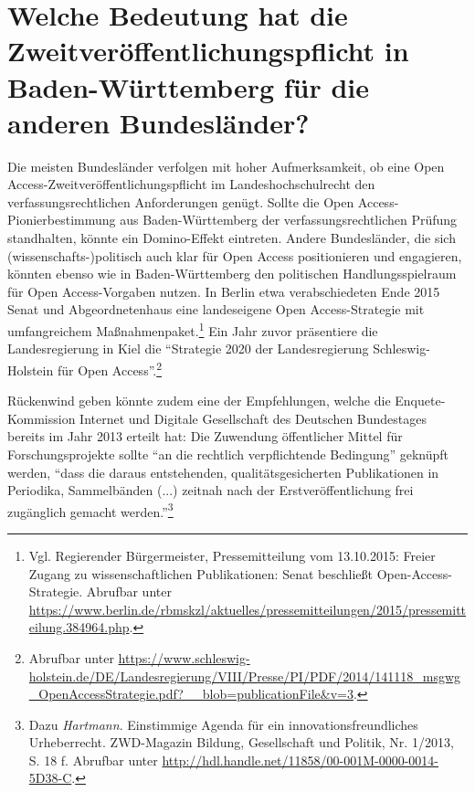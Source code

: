 \documentclass[a4paper,
fontsize=11pt,
oneside,
numbers=noperiodatend,
parskip=half-,
bibliography=totoc,
final
]{scrartcl}
\begin{document}
\hypertarget{welche-bedeutung-hat-die-zweitveruxf6ffentlichungspflicht-in-baden-wuxfcrttemberg-fuxfcr-die-anderen-bundesluxe4nder}{%
\section*{Welche Bedeutung hat die Zweit\-ver\-öffent\-lich\-ungs\-pflicht in
Baden-Württemberg für die anderen
Bundesländer?}\label{welche-bedeutung-hat-die-zweitveruxf6ffentlichungspflicht-in-baden-wuxfcrttemberg-fuxfcr-die-anderen-bundesluxe4nder}}

Die meisten Bundesländer verfolgen mit hoher Aufmerksamkeit, ob eine
Open Access-Zweit\-ver\-öffent\-lich\-ungs\-pflicht im Landeshochschulrecht den
verfassungsrechtlichen Anforderungen genügt. Sollte die Open
Access-Pionierbestimmung aus Baden-Württemberg der
verfassungsrechtlichen Prüfung standhalten, könnte ein Domino-Effekt
eintreten. Andere Bundesländer, die sich (wissenschafts-)politisch auch
klar für Open Access positionieren und engagieren, könnten ebenso wie in
Baden-Württemberg den politischen Handlungsspielraum für Open
Access-Vorgaben nutzen. In Berlin etwa verabschiedeten Ende 2015 Senat
und Abgeordnetenhaus eine landeseigene Open Access-Strategie mit
umfangreichem Maßnahmenpaket.\footnote{Vgl. Regierender Bürgermeister,
  Pressemitteilung vom 13.10.2015: Freier Zugang zu wissenschaftlichen
  Publikationen: Senat beschließt Open-Access-Strategie. Abrufbar unter
  \url{https://www.berlin.de/rbmskzl/aktuelles/pressemitteilungen/2015/pressemitteilung.384964.php}.}
Ein Jahr zuvor präsentiere die Landesregierung in Kiel die
\enquote{Strategie 2020 der Landesregierung Schleswig-Holstein für Open
Access}.\footnote{Abrufbar unter
  \url{https://www.schleswig-holstein.de/DE/Landesregierung/VIII/Presse/PI/PDF/2014/141118_msgwg_OpenAccessStrategie.pdf?__blob=publicationFile\&v=3}.}

Rückenwind geben könnte zudem eine der Empfehlungen, welche die
Enquete-Kommission Internet und Digitale Gesellschaft des Deutschen
Bundestages bereits im Jahr 2013 erteilt hat: Die Zuwendung öffentlicher
Mittel für Forschungsprojekte sollte \enquote{an die rechtlich
verpflichtende Bedingung} geknüpft werden, \enquote{dass die daraus
entstehenden, qualitätsgesicherten Publikationen in Periodika,
Sammelbänden (...) zeitnah nach der Erstveröffentlichung frei zugänglich
gemacht werden.}\footnote{Dazu \emph{Hartmann}. Einstimmige Agenda für
  ein innovationsfreundliches Urheberrecht. ZWD-Magazin Bildung,
  Gesellschaft und Politik, Nr. 1/2013, S. 18 f. Abrufbar unter
  \url{http://hdl.handle.net/11858/00-001M-0000-0014-5D38-C}.}
\end{document}
